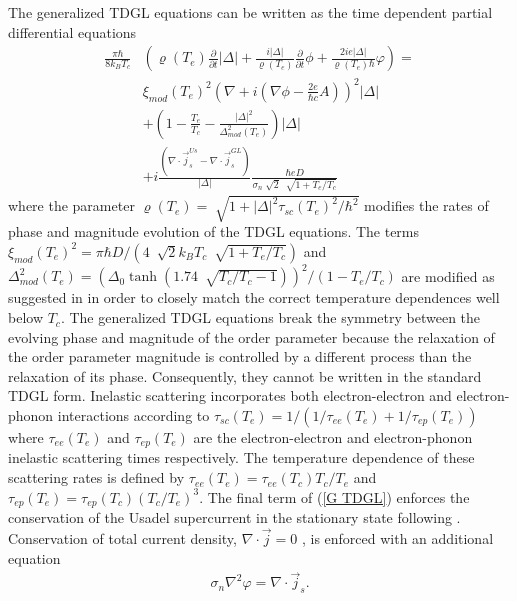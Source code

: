 \documentclass[%
reprint,
 amsmath,amssymb,
aps,
pra,
]{revtex4-1}
\begin{document}
\quad The generalized TDGL equations can be written as the time dependent partial differential equations
\begin{equation}\label{G TDGL}
\begin{aligned}
\frac{\pi \hbar}{8 k_B T_c}&\left(\varrho\left(T_e\right)\frac{\partial}{\partial t}\left|\Delta\right| + \frac{i\left|\Delta\right|}{\varrho\left(T_e\right)}\frac{\partial}{\partial t} \phi + \frac{2 i e \left|\Delta\right|}{\varrho\left(T_e\right) \hbar}\varphi\right) = \\
&\xi_{mod}\left(T_e\right)^2\left(\nabla + i\left(\nabla\phi - \frac{2e}{\hbar c} A\right)\right)^2 \left|\Delta\right| \\
&+ \left(1 - \frac{T_e}{T_c} - \frac{\left|\Delta\right|^2}{\Delta_{mod}^2\left(T_e\right)}\right)\left|\Delta\right| \\
&+ i\frac{\left(\nabla\cdot\vec{j}_s^{Us} - \nabla\cdot\vec{j}_s^{GL}\right)}{\left|\Delta\right|}\frac{\hbar e D}{\sigma_n\sqrt[]{2}\:\sqrt[]{1 + T_e/T_c}}
\end{aligned}     
\end{equation}
where the parameter
\(\varrho\left(T_e\right) = \sqrt[]{1 + \left|\Delta\right|^2\tau_{sc}\left(T_e\right)^2/\hbar^2} \)
modifies the rates of phase and magnitude evolution of the TDGL equations.  The terms 
\({\xi_{mod}\left(T_e\right)}^2 = \pi\hbar D/\left(4\:\sqrt[]{2}k_B T_c\:\sqrt[]{1 + T_e/T_c}\right)\)
and
\(\Delta_{mod}^2\left(T_e\right) = \left(\Delta_0\tanh\left(1.74\:\sqrt[]{T_c/T_c - 1}\right)\right)^2 / \left(1 - T_e/T_c\right)\)
 are modified as suggested in \cite{vodolazov_single-photon_2017} in order to closely match the correct temperature dependences well below \(T_c\).  The generalized TDGL equations break the symmetry between the evolving phase and magnitude of the order parameter because the relaxation  of the order parameter magnitude is controlled by a different process than the relaxation of its phase.  Consequently, they cannot be written in the standard TDGL form.  Inelastic scattering incorporates both electron-electron and electron-phonon interactions according to \(\tau_{sc}\left(T_e\right) = 1/\left(1/\tau_{ee}\left(T_e\right) + 1/\tau_{ep}\left(T_e\right)\right) \)
where 
\(\tau_{ee}\left(T_e\right)\)
and
\(\tau_{ep}\left(T_e\right)\)
are the electron-electron and electron-phonon inelastic scattering times respectively.  The temperature dependence of these scattering rates is defined by 
\(\tau_{ee}\left(T_e\right) = \tau_{ee}\left(T_c\right)T_c/T_e\)
and 
\(\tau_{ep}\left(T_e\right) = \tau_{ep}\left(T_c\right)\left(T_c/T_e\right)^3\). 
The final term of (\ref{G TDGL}) enforces the conservation of the Usadel supercurrent in the stationary state following \cite{vodolazov_single-photon_2017}.  Conservation of total current density, 
\(\nabla\cdot\vec{j} = 0 \)
, is enforced with an additional equation
\begin{equation}\label{current conservation}
\begin{aligned}
\sigma_n{\nabla}^2\varphi = \nabla\cdot\vec{j}_s.
\end{aligned}     
\end{equation}
\end{document}
